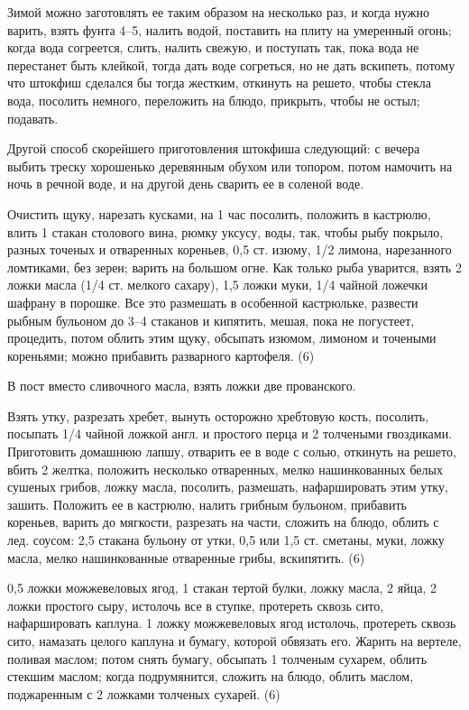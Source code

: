 Зимой можно заготовлять ее таким образом на несколько раз, и когда нужно варить, взять фунта 4--5, налить водой, поставить на плиту на умеренный огонь; когда вода согреется, слить, налить свежую, и поступать так, пока вода не перестанет быть клейкой, тогда дать воде согреться, но не дать вскипеть, потому что штокфиш сделался бы тогда жестким, откинуть на решето, чтобы стекла вода, посолить немного, переложить на блюдо, прикрыть, чтобы не остыл; подавать. 

Другой способ скорейшего приготовления штокфиша следующий: с вечера выбить треску хорошенько деревянным обухом или топором, потом намочить на ночь в речной воде, и на другой день сварить ее в соленой воде. 


Очистить щуку, нарезать кусками, на 1 час посолить, положить в кастрюлю, влить 1 стакан столового вина, рюмку уксусу, воды, так, чтобы рыбу покрыло, разных точеных и отваренных кореньев, 0,5 ст. изюму, 1/2 лимона, нарезанного ломтиками, без зерен; варить на большом огне. Как только рыба уварится, взять 2 ложки масла (1/4 ст. мелкого сахару), 1,5 ложки муки, 1/4 чайной ложечки шафрану в порошке. Все это размешать в особенной кастрюльке, развести рыбным бульоном до 3--4 стаканов и кипятить, мешая, пока не погустеет, процедить, потом облить этим щуку, обсыпать изюмом, лимоном и точеными кореньями; можно прибавить разварного картофеля. (6) 

В пост вместо сливочного масла, взять ложки две прованского. 


Взять утку, разрезать хребет, вынуть осторожно хребтовую кость, посолить, посыпать 1/4 чайной ложкой англ. и простого перца и 2 толчеными гвоздиками. Приготовить домашнюю лапшу, отварить ее в воде с солью, откинуть на решето, вбить 2 желтка, положить несколько отваренных, мелко нашинкованных белых сушеных грибов, ложку масла, посолить, размешать, нафаршировать этим утку, зашить. Положить ее в кастрюлю, налить грибным бульоном, прибавить кореньев, варить до мягкости, разрезать на части, сложить на блюдо, облить с лед. соусом: 2,5 стакана бульону от утки, 0,5 или 1,5 ст. сметаны, муки, ложку масла, мелко нашинкованные отваренные грибы, вскипятить. (6) 


0,5 ложки можжевеловых ягод, 1 стакан тертой булки, ложку масла, 2 яйца, 2 ложки простого сыру, истолочь все в ступке, протереть сквозь сито, нафаршировать каплуна. 1 ложку можжевеловых ягод истолочь, протереть сквозь сито, намазать целого каплуна и бумагу, которой обвязать его. Жарить на вертеле, поливая маслом; потом снять бумагу, обсыпать 1 толченым сухарем, облить стекшим маслом; когда подрумянится, сложить на блюдо, облить маслом, поджаренным с 2 ложками толченых сухарей. (6) 

